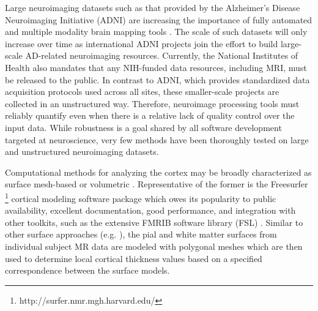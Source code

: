 Large neuroimaging datasets such as that provided by the Alzheimer's
Disease Neuroimaging Initiative (ADNI) are increasing the importance
of fully automated and multiple modality brain mapping tools
\cite{Weiner2012}.  The scale of such datasets will only increase over
time as international ADNI projects join the effort to build
large-scale AD-related neuroimaging resources.  Currently, the
National Institutes of Health also mandates that any NIH-funded data
resources, including MRI, must be released to the public.  In contrast
to ADNI, which provides standardized data acquisition protocols used
across all sites, these smaller-scale projects are collected in an
unstructured way.  Therefore, neuroimage processing tools must
reliably quantify even when there is a relative lack of quality
control over the input data.  While robustness is a goal shared by all
software development targeted at neuroscience, very few methods have
been thoroughly tested on large and unstructured neuroimaging datasets.

Computational methods for analyzing the cortex may be 
broadly characterized as surface mesh-based or volumetric \citep{scott2009,clarkson2011}.  Representative of the former is the
Freesurfer%
\footnote{
http://surfer.nmr.mgh.harvard.edu/
}
cortical modeling software package \citep{dale1999,fischl1999,fischl2000,fischl2002,fischl2004}
which owes its popularity to public availability, excellent documentation, 
good performance, and  integration with other toolkits, such as the extensive FMRIB software 
library (FSL) \citep{smith2004}.  Similar to other surface
approaches (e.g. \cite{davatzikos1996,magnotta1999,macdonald2000,kim2005}), the pial
and white matter surfaces from individual subject MR data are modeled with polygonal meshes  
which are then used to determine local cortical thickness values based on a specified correspondence between 
the surface models.

